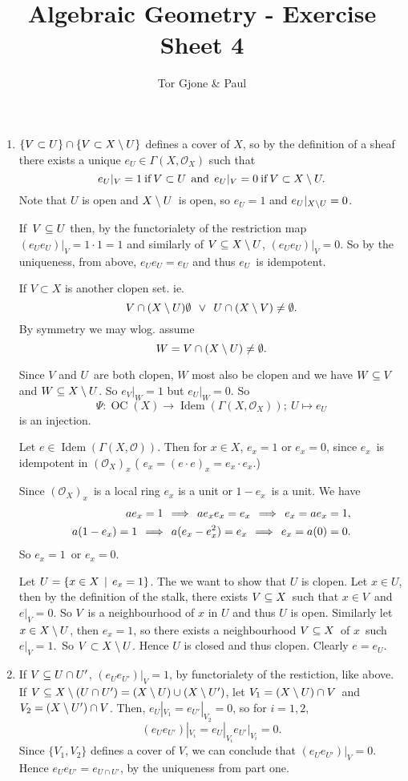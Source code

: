 \documentclass[a4paper,11pt,english]{article}
\title{\textbf{Algebraic Geometry} - Exercise Sheet 4}
\author{Tor Gjone \& Paul}
\DeclareMathOperator{\OC}{OC}
\DeclareMathOperator{\Idem}{Idem}
\begin{document}
\mmaketitle

\renewcommand{\O}{\mathcal{O}}

\begin{exercise}[2]
\begin{enumerate}
\item
$\{ V \subset U \} \cap \{ V \subset X \setminus U \}$ defines a cover of $X$, so by 
the definition of a sheaf there exists a unique $e_U \in \Gamma(X,\O_X)$ such
that 
\[ e_U |_V = 1 \:\text{if}\: V \subset U \:\:\text{and}\:\: e_U|_V = 0 \:\text{if}\: V \subset X
\setminus U. \]
Note that $U$ is open and $X\setminus U$ is open, so $e_U = 1$ and $e_U|_{X\setminus U} =
0$. 

If $V \subseteq U$ then, by the functorialety of the restriction map $(e_U e_U) |_V =
1 \cdot 1 = 1$ and similarly of $V \subseteq X \setminus U$, $(e_U e_U)|_V = 0$.
So by the uniqueness, from above, $e_U e_U = e_U$ and thus $e_U$ is idempotent.

If $V \subset X$ is another clopen set. ie. 
\[ V \cap (X\setminus U) \emptyset \:\:\lor\:\: U \cap (X \setminus V) \ne \emptyset. \]
By symmetry we may wlog. assume 
\[ W = V \cap (X \setminus U) \ne \emptyset. \]

Since $V$ and $U$ are both clopen, $W$ most also be clopen and we have 
$W \subseteq V$ and $W \subseteq X\setminus U$. So $e_V|_W = 1$  but $e_U|_W = 0$. So 
\[ \Psi : \OC(X) \to \Idem(\Gamma(X,\O_X));\: U \mapsto e_U \]
is an injection.

Let $e \in \Idem(\Gamma(X,\O))$. Then for $x\in X$, $e_x=1$ or $e_x=0$, since 
$e_x$ is idempotent in $(\O_X)_x$ ( $e_x = (e\cdot e)_x = e_x \cdot e_x$.)

Since $(\O_X)_x$ is a local ring $e_x$ is a unit or $1-e_x$ is a unit.
We have 
\begin{align}
ae_x = 1 \q\ra ae_x e_x = e_x \q\ra e_x = ae_x = 1, \\
%
a (1 - e_x) = 1 \q\ra a(e_x - e_x^2) = e_x \q\ra e_x = a(0) = 0.
\end{align}
So $e_x = 1$ or $e_x = 0$. 

Let $U = \{ x \in X \:\:|\:\: e_x = 1\}$. The we want to show that $U$ is clopen. 
Let $x\in U$, then by the definition of the stalk, there exists $V \subseteq X$ such
that $x \in V$ and $e|_V = 0$. So $V$ is a neighbourhood of $x$ in $U$ and thus
$U$ is open. Similarly let $x \in X\setminus U$, then $e_x = 1$, so there exists a
neighbourhood $V \subseteq X$ of $x$ such $e|_V = 1$. So $V \subset X\setminus U$. Hence $U$
is closed and thus clopen. 
Clearly $e = e_U$.

\item 
If $V \subseteq U \cap U'$, $(e_U e_{U'})|_V = 1$, by functorialety of the restiction,
like above. 
If $V \subseteq X \setminus (U \cap U') = (X \setminus U) \cup (X \setminus U')$, 
let $V_1 = (X \setminus U) \cap V$ and $V_2 = (X \setminus U') \cap V$. Then, 
$e_U|_{V_1} = e_{U'}|_{V_2} = 0$, so for $i=1,2$,
\[ (e_U e_{U'})|_{V_i} = e_U|_{V_i} e_{U'}|_{V_i} = 0. \]
Since $\{ V_1, V_2 \}$ defines a cover of $V$, we can conclude that $(e_U
e_{U'})|_V = 0$. Hence $e_U e_{U'} = e_{U\cap U'}$, by the uniqueness from part
one.


\end{enumerate}
\end{exercise}
\end{document}
